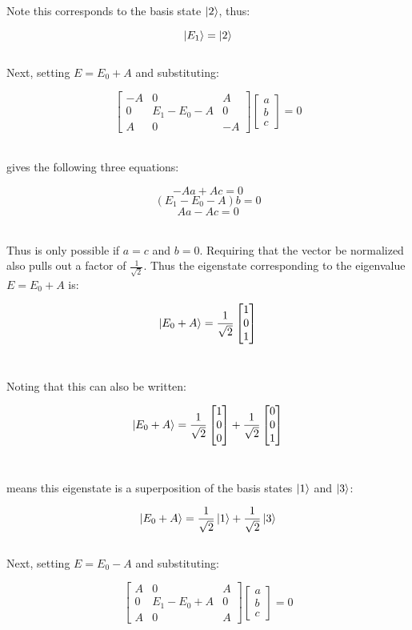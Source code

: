 \documentclass[9pt]{extarticle}
\begin{document}
\begin{multicols*}{2}
Note this corresponds to the basis state $\ket 2$, thus:

$$\ket{E_1} = \ket 2$$ \\ 

Next, setting $E = E_0 +A$ and substituting:

$$
\begin{bmatrix}
        -A & 0 & A \\ 
        0 & E_1 - E_0 - A & 0 \\ 
        A & 0 & - A
\end{bmatrix}
\begin{bmatrix}
        a \\ b \\ c
\end{bmatrix}
=0
$$ \

gives the following three equations:

$$-Aa + Ac = 0$$
$$(E_1-E_0-A)b = 0$$
$$Aa - Ac = 0$$ \ 

Thus is only possible if $a = c$ and $b=0$. Requiring that the vector be normalized also pulls out a factor of $\frac{1}{\sqrt 2}$. Thus the eigenstate corresponding to the eigenvalue $E = E_0 +A$ is:

$$
\ket{E_0+A} = \frac{1}{\sqrt 2}
\begin{bmatrix} 1 \\ 0 \\ 1 \end{bmatrix}
$$ \ 

Noting that this can also be written:

$$
\ket{E_0+A} = \frac{1}{\sqrt 2}
\begin{bmatrix} 1 \\ 0 \\ 0 \end{bmatrix} +
\frac{1}{\sqrt 2}
\begin{bmatrix} 0 \\ 0 \\ 1 \end{bmatrix}
$$ \ 

means this eigenstate is a superposition of the basis states $\ket 1$ and $\ket 3$:

$$\ket{E_0+A} = \frac{1}{\sqrt 2} \ket 1 + \frac{1}{\sqrt 2} \ket 3$$ \\ 

Next, setting $E = E_0 - A$ and substituting:

$$
\begin{bmatrix}
        A & 0 & A \\       
        0 & E_1 - E_0 + A & 0 \\
        A & 0 & A
\end{bmatrix}
\begin{bmatrix}
        a \\ b \\ c
\end{bmatrix}
=0
$$ \


\end{multicols*}
\end{document}
